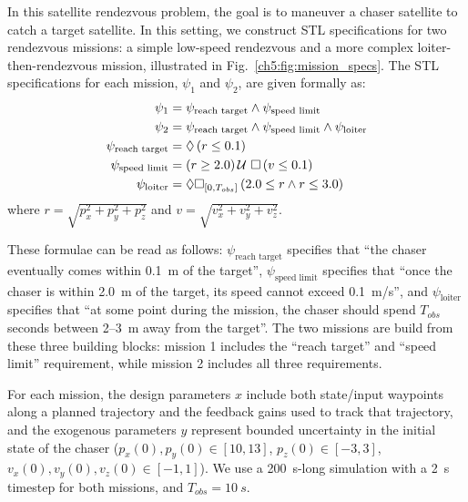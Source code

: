 In this satellite rendezvous problem, the goal is to maneuver a chaser satellite to catch a target satellite. In this setting, we construct STL specifications for two rendezvous missions: a simple low-speed rendezvous and a more complex loiter-then-rendezvous mission, illustrated in Fig.~\ref{ch5:fig:mission_specs}. The STL specifications for each mission, $\psi_1$ and $\psi_2$, are given formally as:
\begin{align*}
    \psi_1                   & = \psi_\text{reach target} \wedge \psi_\text{speed limit}                           \\
    \psi_2                   & = \psi_\text{reach target} \wedge \psi_\text{speed limit} \wedge \psi_\text{loiter} \\
    \psi_\text{reach target} & = \lozenge \left( r \leq 0.1 \right)                                                       \\
    \psi_\text{speed limit}  & = \left( r \geq 2.0 \right) \mathcal{U}\ \square \left( v \leq 0.1 \right)                                   \\
    \psi_\text{loiter}       & = \lozenge \square_{[0, T_{obs}]} \left( 2.0 \leq r \wedge r \leq 3.0 \right)
\end{align*}
where $r = \sqrt{p_x^2 + p_y^2 + p_z^2}$ and $v = \sqrt{v_x^2 + v_y^2 + v_z^2}$.

These formulae can be read as follows: $\psi_\text{reach target}$ specifies that ``the chaser eventually comes within \SI{0.1}{m} of the target'', $\psi_\text{speed limit}$ specifies that ``once the chaser is within \SI{2.0}{m} of the target, its speed cannot exceed \SI{0.1}{m/s}'', and $\psi_\text{loiter}$ specifies that ``at some point during the mission, the chaser should spend $T_{obs}$ seconds between 2--\SI{3}{m} away from the target''. The two missions are build from these three building blocks: mission 1 includes the ``reach target'' and ``speed limit'' requirement, while mission 2 includes all three requirements.

For each mission, the design parameters $x$ include both state/input waypoints along a planned trajectory and the feedback gains used to track that trajectory, and the exogenous parameters $y$ represent bounded uncertainty in the initial state of the chaser ($p_x(0), p_y(0) \in [10, 13]$, $p_z(0) \in [-3, 3]$, $v_x(0), v_y(0), v_z(0) \in [-1, 1]$). We use a \SI{200}{s}-long simulation with a \SI{2}{s} timestep for both missions, and $T_{obs} = \SI{10}{s}$.

